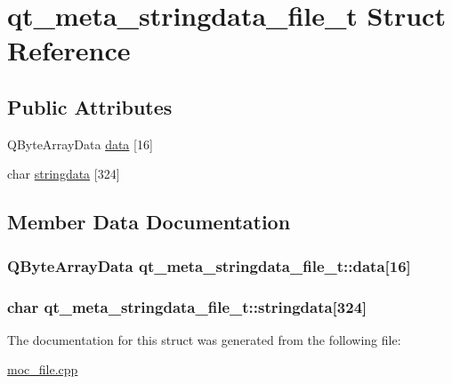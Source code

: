 \hypertarget{structqt__meta__stringdata__file__t}{\section{qt\-\_\-meta\-\_\-stringdata\-\_\-file\-\_\-t Struct Reference}
\label{structqt__meta__stringdata__file__t}
}
\subsection*{Public Attributes}
\begin{DoxyCompactItemize}
\item 
Q\-Byte\-Array\-Data \hyperlink{structqt__meta__stringdata__file__t_a013f54e8ef6f6b66914da7f4ca563818}{data} \mbox{[}16\mbox{]}
\item 
char \hyperlink{structqt__meta__stringdata__file__t_a3f70f18d712a73907f0f97ec558f63cc}{stringdata} \mbox{[}324\mbox{]}
\end{DoxyCompactItemize}


\subsection{Member Data Documentation}
\hypertarget{structqt__meta__stringdata__file__t_a013f54e8ef6f6b66914da7f4ca563818}{
\subsubsection[{data}]{\setlength{\rightskip}{0pt plus 5cm}Q\-Byte\-Array\-Data qt\-\_\-meta\-\_\-stringdata\-\_\-file\-\_\-t\-::data\mbox{[}16\mbox{]}}}\label{structqt__meta__stringdata__file__t_a013f54e8ef6f6b66914da7f4ca563818}
\hypertarget{structqt__meta__stringdata__file__t_a3f70f18d712a73907f0f97ec558f63cc}{
\subsubsection[{stringdata}]{\setlength{\rightskip}{0pt plus 5cm}char qt\-\_\-meta\-\_\-stringdata\-\_\-file\-\_\-t\-::stringdata\mbox{[}324\mbox{]}}}\label{structqt__meta__stringdata__file__t_a3f70f18d712a73907f0f97ec558f63cc}


The documentation for this struct was generated from the following file\-:\begin{DoxyCompactItemize}
\item 
\hyperlink{moc__file_8cpp}{moc\-\_\-file.\-cpp}\end{DoxyCompactItemize}
